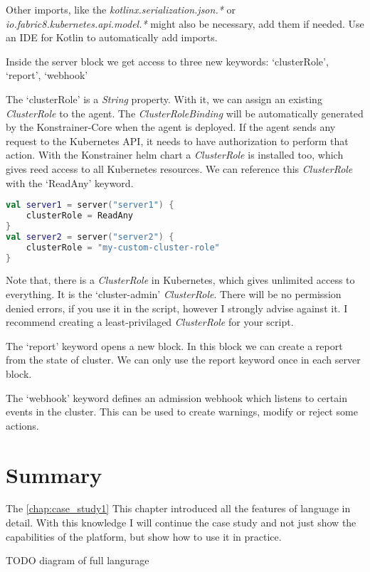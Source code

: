Other imports, like the \emph{kotlinx.serialization.json.*} or \emph{io.fabric8.kubernetes.api.model.*} might also be necessary, add them if needed. Use an IDE for Kotlin to automatically add imports.

Inside the server block we get access to three new keywords: `clusterRole', `report', `webhook'

The `clusterRole' is a \emph{String} property. With it, we can assign an existing \emph{ClusterRole} to the agent. The \emph{ClusterRoleBinding} will be automatically generated by the Konstrainer-Core when the agent is deployed. If the agent sends any request to the Kubernetes API, it needs to have authorization to perform that action. With the Konstrainer helm chart a \emph{ClusterRole} is installed too, which gives reed access to all Kubernetes resources. We can reference this \emph{ClusterRole} with the `ReadAny' keyword.

\begin{lstlisting}[caption={Usage of the clusterRole keyword},language=Kotlin,label=code:clusterrole_usage]
val server1 = server("server1") {
    clusterRole = ReadAny
}
val server2 = server("server2") {
    clusterRole = "my-custom-cluster-role"
}
\end{lstlisting}

Note that, there is a \emph{ClusterRole} in Kubernetes, which gives unlimited access to everything. It is the `cluster-admin' \emph{ClusterRole}. There will be no permission denied errors, if you use it in the script, however I strongly advise against it. I recommend creating a least-privilaged \emph{ClusterRole} for your script.

The `report' keyword opens a new block. In this block we can create a report from the state of cluster. We can only use the report keyword once in each server block.

The `webhook' keyword defines an admission webhook which listens to certain events in the cluster. This can be used to create warnings, modify or reject some actions.





\section{Summary}

The \ref{chap:case_study1}
This chapter introduced all the features of language in detail. With this knowledge I will continue the case study and not just show the capabilities of the platform, but show how to use it in practice.

TODO diagram of full langurage


